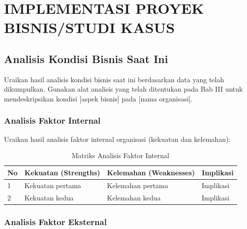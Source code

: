 
\chapter{IMPLEMENTASI PROYEK BISNIS/STUDI KASUS}
\label{bab:implementasi}

\section{Analisis Kondisi Bisnis Saat Ini}
\label{sec:analisis-kondisi}

Uraikan hasil analisis kondisi bisnis saat ini berdasarkan data yang telah dikumpulkan.
Gunakan alat analisis yang telah ditentukan pada Bab III untuk mendeskripsikan kondisi
[aspek bisnis] pada [nama organisasi].

\subsection{Analisis Faktor Internal}
\label{subsec:analisis-internal}

Uraikan hasil analisis faktor internal organisasi (kekuatan dan kelemahan):

\begin{table}[H]
\caption{Matriks Analisis Faktor Internal}
\label{tab:analisis-internal}
\begin{isitable}
\begin{tabular}{p{0.5cm} p{5cm} p{5cm} p{4cm}}
\toprule
\textbf{No} & \textbf{Kekuatan (Strengths)} & \textbf{Kelemahan (Weaknesses)} & \textbf{Implikasi} \\
\midrule
1 & Kekuatan pertama & Kelemahan pertama & Implikasi \\
2 & Kekuatan kedua & Kelemahan kedua & Implikasi \\
\bottomrule
\end{tabular}
\end{isitable}
\end{table}

\subsection{Analisis Faktor Eksternal}
\label{subsec:analisis-eksternal}

